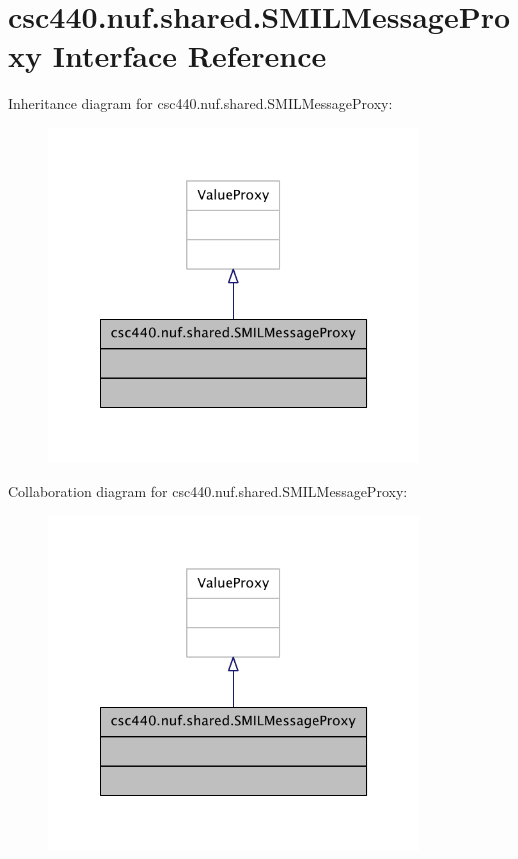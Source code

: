 \hypertarget{interfacecsc440_1_1nuf_1_1shared_1_1_s_m_i_l_message_proxy}{\section{csc440.\-nuf.\-shared.\-S\-M\-I\-L\-Message\-Proxy Interface Reference}
\label{interfacecsc440_1_1nuf_1_1shared_1_1_s_m_i_l_message_proxy}
}


Inheritance diagram for csc440.\-nuf.\-shared.\-S\-M\-I\-L\-Message\-Proxy\-:
\nopagebreak
\begin{figure}[H]
\begin{center}
\leavevmode
\includegraphics[width=278pt]{interfacecsc440_1_1nuf_1_1shared_1_1_s_m_i_l_message_proxy__inherit__graph}
\end{center}
\end{figure}


Collaboration diagram for csc440.\-nuf.\-shared.\-S\-M\-I\-L\-Message\-Proxy\-:
\nopagebreak
\begin{figure}[H]
\begin{center}
\leavevmode
\includegraphics[width=278pt]{interfacecsc440_1_1nuf_1_1shared_1_1_s_m_i_l_message_proxy__coll__graph}
\end{center}
\end{figure}


